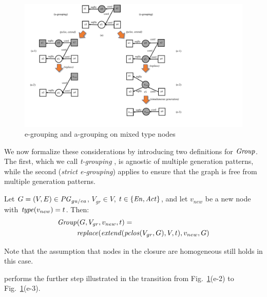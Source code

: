 \begin{figure}
\centering
\includegraphics[scale=.5]{reworked-fig9.pdf} 
\caption{e-grouping and a-grouping on mixed type nodes} \label{fig:e2-a4}
\end{figure}

We now formalize these considerations by introducing two definitions for $\mathit{Group}$. The first, which we call \textit{t-grouping} , is agnostic of multiple generation patterns, while the second (\textit{strict e-grouping}) applies  to ensure that the  graph is free from multiple generation patterns. 

\vspace{10pt}
\begin{definition}[t-Grouping]
\label{def:t-grouping}
Let $G=(V,E) \in \mathit{PG}_{gu/ea}$, $V_{gr} \in V$, $t \in \{\mathit{En}, \mathit{Act}\}$, and let  $v_{new}$ be a new node with $\mathit{type}(v_{new}) = t$.
%
Then:
\begin{align*} 
\group & (G, V_{gr}, v_{new}, t) = \\
& \repl( \extend(\clos(V_{gr},\jwb{G}), V, t), v_{new},  G )
\end{align*}
\label{eq:t-grouping}
\end{definition}

Note that the assumption that  nodes in the closure are homogeneous still holds in this case. 

 performs the further step illustrated in the transition from Fig.~\ref{fig:e2-a4}(e-2) to Fig.~\ref{fig:e2-a4}(e-3). 


